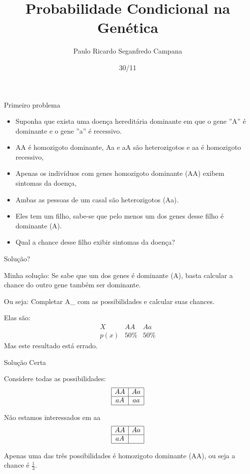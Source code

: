\documentclass{beamer}
\title[]{Probabilidade Condicional na Genética}
\date[]{30/11}
\author[Paulo Ricardo]{Paulo Ricardo Seganfredo Campana}
\begin{document}
	
\begin{frame}
	\titlepage
\end{frame}	
	
\begin{frame}{Primeiro problema}
	\begin{itemize}
		\item Suponha que exista uma doença hereditária dominante em que o gene ''A'' é dominante e o gene ''a'' é recessivo.
		\item AA é homozigoto dominante, Aa e aA são heterozigotos e aa é homozigoto recessivo,
		\item Apenas os indivíduos com genes homozigoto dominante (AA) exibem sintomas da doença,
		\item Ambas as pessoas de um casal são heterozigotos (Aa).
		\item Eles tem um filho, sabe-se que pelo menos um dos genes desse filho é dominante (A).
		\item Qual a chance desse filho exibir sintomas da doença?
	\end{itemize} 
\end{frame}

\begin{frame}{Solução?}
	\begin{block}{Minha solução:}
		Se sabe que um dos genes é dominante (A), basta calcular a chance do outro gene também ser dominante.
	\end{block}
	\begin{block}{Ou seja:}
		Completar A\_ com as possibilidades e calcular suas chances.
	\end{block}
	\begin{block}{Elas são:}
		\[	\begin{array}{c|cc}
			X & AA & Aa\\
			p(x) & 50\% & 50\%
			\end{array}\]
		Mas este resultado está errado.
	\end{block}
\end{frame}

\begin{frame}{Solução Certa}
	\begin{block}{Considere todas as possibilidades:}
		\[	\begin{array}{|c|c|}
			\hline
			AA & Aa\\
			\hline
			aA & aa\\
			\hline
		\end{array}\]
	\end{block}
	\begin{block}{Não estamos interessados em aa}
		\[  \begin{array}{|c|c|}
			\hline
			AA & Aa\\
			\hline
			aA &\\
			\hline
		\end{array}\]
	\end{block}
	Apenas uma das três possibilidades é homozigoto dominante (AA), ou seja a chance é $\frac{1}{3}$.
\end{frame}
\end{document}

